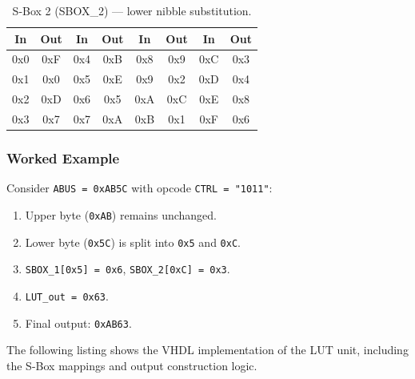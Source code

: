 \documentclass[12pt, a4paper]{report}
\begin{document}
\begin{table}[H]
\centering
\caption{S-Box 2 (SBOX\_2) — lower nibble substitution.}
\label{tab:sbox2}
\begin{tabular}{cc|cc|cc|cc}
\toprule
\textbf{In} & \textbf{Out} & \textbf{In} & \textbf{Out} &
\textbf{In} & \textbf{Out} & \textbf{In} & \textbf{Out} \\
\midrule
0x0 & 0xF & 0x4 & 0xB & 0x8 & 0x9 & 0xC & 0x3 \\
0x1 & 0x0 & 0x5 & 0xE & 0x9 & 0x2 & 0xD & 0x4 \\
0x2 & 0xD & 0x6 & 0x5 & 0xA & 0xC & 0xE & 0x8 \\
0x3 & 0x7 & 0x7 & 0xA & 0xB & 0x1 & 0xF & 0x6 \\
\bottomrule
\end{tabular}
\end{table}

\subsubsection{Worked Example}

Consider \texttt{ABUS = 0xAB5C} with opcode \texttt{CTRL = "1011"}:

\begin{enumerate}
  \item Upper byte (\texttt{0xAB}) remains unchanged.
  \item Lower byte (\texttt{0x5C}) is split into \texttt{0x5} and \texttt{0xC}.
  \item \texttt{SBOX\_1[0x5] = 0x6}, \texttt{SBOX\_2[0xC] = 0x3}.
  \item \texttt{LUT\_out = 0x63}.
  \item Final output: \texttt{0xAB63}.
\end{enumerate}

The following listing shows the VHDL implementation of the LUT unit,
including the S-Box mappings and output construction logic.
\end{document}
